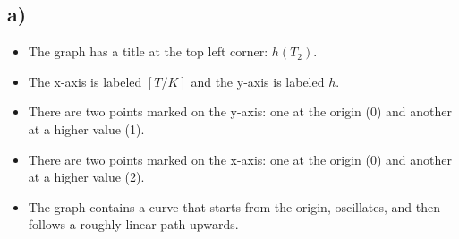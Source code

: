 

\subsection*{a)}
\begin{itemize}
    \item The graph has a title at the top left corner: \(h(T_2)\).
    \item The x-axis is labeled \([T/K]\) and the y-axis is labeled \(h\).
    \item There are two points marked on the y-axis: one at the origin (0) and another at a higher value (1).
    \item There are two points marked on the x-axis: one at the origin (0) and another at a higher value (2).
    \item The graph contains a curve that starts from the origin, oscillates, and then follows a roughly linear path upwards.
\end{itemize}